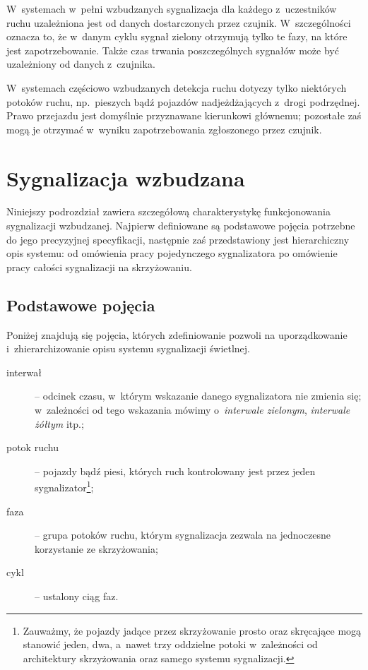 \documentclass{pracamgr}
\theoremstyle{plain}
\begin{document}
W~systemach w~pełni wzbudzanych sygnalizacja dla każdego z~uczestników
ruchu uzależniona jest od danych dostarczonych przez czujnik.
W~szczególności oznacza to, że w~danym cyklu sygnał zielony otrzymują
tylko te fazy, na które jest zapotrzebowanie. Także czas trwania
poszczególnych sygnałów może być uzależniony od danych z~czujnika.

W~systemach częściowo wzbudzanych detekcja ruchu dotyczy tylko
niektórych potoków ruchu, np.~pieszych bądź pojazdów nadjeżdżających
z~drogi podrzędnej. Prawo przejazdu jest domyślnie przyznawane
kierunkowi głównemu; pozostałe zaś mogą je otrzymać w~wyniku
zapotrzebowania zgłoszonego przez czujnik.

\section{Sygnalizacja wzbudzana}
\label{s:sygn-szczegoly}

Niniejszy podrozdział zawiera szczegółową charakterystykę
funkcjonowania sygnalizacji wzbudzanej. Najpierw definiowane są
podstawowe pojęcia potrzebne do jego precyzyjnej specyfikacji,
następnie zaś przedstawiony jest hierarchiczny opis systemu: od
omówienia pracy pojedynczego sygnalizatora po omówienie pracy całości
sygnalizacji na skrzyżowaniu.

\subsection{Podstawowe pojęcia}
\label{ss:pojecia}

Poniżej znajdują się pojęcia, których zdefiniowanie pozwoli na
uporządkowanie i~zhierarchizowanie opisu systemu sygnalizacji
świetlnej.
\begin{description}
  \item[interwał] -- odcinek czasu, w~którym wskazanie danego
  sygnalizatora nie zmienia się; w~zależności od tego wskazania mówimy
  o~\emph{interwale zielonym}, \emph{interwale żółtym} itp.;
  \item[potok ruchu] -- pojazdy bądź piesi, których ruch kontrolowany
  jest przez jeden sygnalizator\footnote{Zauważmy, że pojazdy jadące
    przez skrzyżowanie prosto oraz skręcające mogą stanowić jeden,
    dwa, a~nawet trzy oddzielne potoki w~zależności od architektury
    skrzyżowania oraz samego systemu sygnalizacji.};
  \item[faza] -- grupa potoków ruchu, którym sygnalizacja zezwala na
  jednoczesne korzystanie ze skrzyżowania;
  \item[cykl] -- ustalony ciąg faz.
\end{description}
\end{document}
